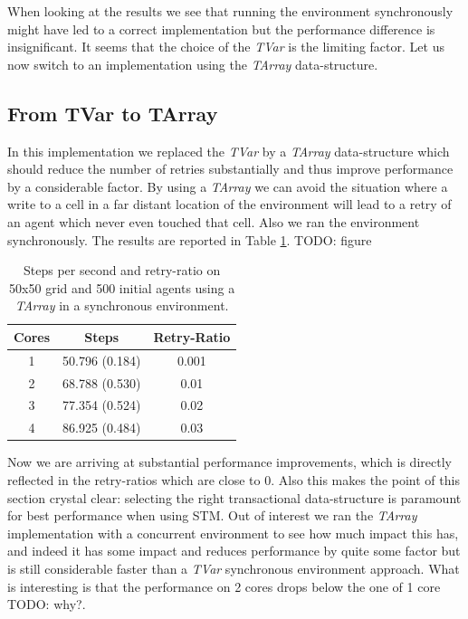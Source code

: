 When looking at the results we see that running the environment synchronously might have led to a correct implementation but the performance difference is insignificant. It seems that the choice of the \textit{TVar} is the limiting factor. Let us now switch to an implementation using the \textit{TArray} data-structure.

\subsection{From TVar to TArray}
In this implementation we replaced the \textit{TVar} by a \textit{TArray} data-structure which should reduce the number of retries substantially and thus improve performance by a considerable factor. By using a \textit{TArray} we can avoid the situation where a write to a cell in a far distant location of the environment will lead to a retry of an agent which never even touched that cell. Also we ran the environment synchronously. The results are reported in Table \ref{tab:tarray_results_syncenv_time}. TODO: figure

\begin{table}
	\centering
  	\begin{tabular}{ c || c | c  }
        Cores & Steps          & Retry-Ratio \\ \hline \hline 
    	1     & 50.796 (0.184) & 0.001 		 \\ \hline
   		2     & 68.788 (0.530) & 0.01 		 \\ \hline
   		3     & 77.354 (0.524) & 0.02 		 \\ \hline
   		4     & 86.925 (0.484) & 0.03
   	\end{tabular}
  	
  	\caption{Steps per second and retry-ratio on 50x50 grid and 500 initial agents using a \textit{TArray} in a synchronous environment.}
	\label{tab:tarray_results_syncenv_time}
\end{table}

Now we are arriving at substantial performance improvements, which is directly reflected in the retry-ratios which are close to 0. Also this makes the point of this section crystal clear: selecting the right transactional data-structure is paramount for best performance when using STM. Out of interest we ran the \textit{TArray} implementation with a concurrent environment to see how much impact this has, and indeed it has some impact and reduces performance by quite some factor but is still considerable faster than a \textit{TVar} synchronous environment approach. What is interesting is that the performance on 2 cores drops below the one of 1 core TODO: why?.

